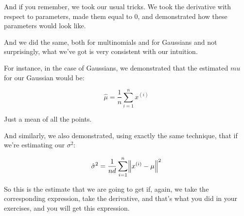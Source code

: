 \documentclass[a4paper, 12pt]{article}
\begin{document}
And if you remember, we took our usual tricks. We took the derivative with
respect to parameters, made them equal to \(0\), and demonstrated how these
parameters would look like.

And we did the same, both for multinomials and for Gaussians and not
surprisingly, what we've got is very consistent with our intuition.

For instance, in the case of Gaussians, we demonstrated that the estimated
\(mu\) for our Gaussian would be:

\begin{equation}
\label{eq:org0956bec}
\hat{\mu} = \frac{1}{n} \sum_{i=1}^{n} x^{(i)}
\end{equation}

Just a mean of all the points.

And similarly, we also demonstrated, using exactly the same technique, that if
we're estimating our \(\sigma^2\):

\begin{equation}
\label{eq:org77fbb73}
\hat{\sigma}^2 = \frac{1}{nd} \sum_{i=1}^{n} \norm{x^{(i)} - \mu}^2
\end{equation}

So this is the estimate that we are going to get if, again, we take the
corresponding expression, take the derivative, and that's what you did in your
exercises, and you will get this expression.
\end{document}
